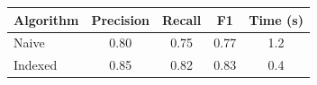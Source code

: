 \begin{table}
\centering
\begin{tabular}{lcccc}
\toprule
Algorithm & Precision & Recall & F1 & Time (s) \\
\midrule
Naive & 0.80 & 0.75 & 0.77 & 1.2 \\
Indexed & 0.85 & 0.82 & 0.83 & 0.4 \\
\bottomrule
\end{tabular}
\end{table}
